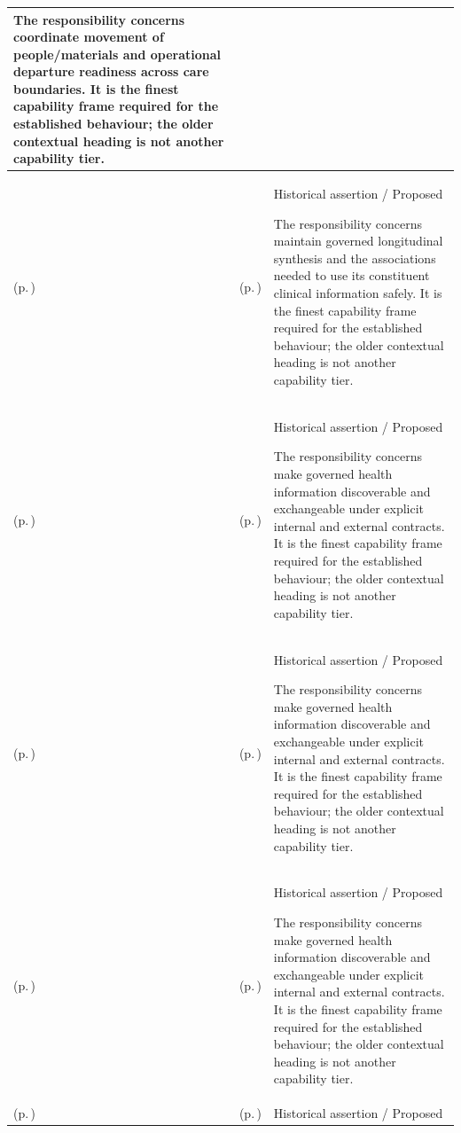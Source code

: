 \begin{longtable}{|>{\raggedright\arraybackslash}p{0.27\TableWidth}|>{\raggedright\arraybackslash}p{0.27\TableWidth}|>{\raggedright\arraybackslash}p{0.46\TableWidth}|}
The responsibility concerns coordinate movement of people/materials and operational departure readiness across care boundaries. It is the finest capability frame required for the established behaviour; the older contextual heading is not another capability tier.\\\hline
\nameref{cap:bec-clinical-information-stewardship-enablement} (p.\,\pageref{cap:bec-clinical-information-stewardship-enablement}) & \nameref{cap:bec-patient-clinical-record} (p.\,\pageref{cap:bec-patient-clinical-record}) & Historical assertion / Proposed

The responsibility concerns maintain governed longitudinal synthesis and the associations needed to use its constituent clinical information safely. It is the finest capability frame required for the established behaviour; the older contextual heading is not another capability tier.\\\hline
\nameref{cap:bec-health-information-connectivity-enablement} (p.\,\pageref{cap:bec-health-information-connectivity-enablement}) & \nameref{cap:bec-health-information-exchange} (p.\,\pageref{cap:bec-health-information-exchange}) & Historical assertion / Proposed

The responsibility concerns make governed health information discoverable and exchangeable under explicit internal and external contracts. It is the finest capability frame required for the established behaviour; the older contextual heading is not another capability tier.\\\hline
\nameref{cap:bec-health-information-connectivity-enablement} (p.\,\pageref{cap:bec-health-information-connectivity-enablement}) & \nameref{cap:bec-health-information-access} (p.\,\pageref{cap:bec-health-information-access}) & Historical assertion / Proposed

The responsibility concerns make governed health information discoverable and exchangeable under explicit internal and external contracts. It is the finest capability frame required for the established behaviour; the older contextual heading is not another capability tier.\\\hline
\nameref{cap:bec-health-information-connectivity-enablement} (p.\,\pageref{cap:bec-health-information-connectivity-enablement}) & \nameref{cap:bec-health-information-communication} (p.\,\pageref{cap:bec-health-information-communication}) & Historical assertion / Proposed

The responsibility concerns make governed health information discoverable and exchangeable under explicit internal and external contracts. It is the finest capability frame required for the established behaviour; the older contextual heading is not another capability tier.\\\hline
\nameref{cap:bec-information-protection-accountability-enablement} (p.\,\pageref{cap:bec-information-protection-accountability-enablement}) & \nameref{cap:bec-health-information-control} (p.\,\pageref{cap:bec-health-information-control}) & Historical assertion / Proposed


\end{longtable}
